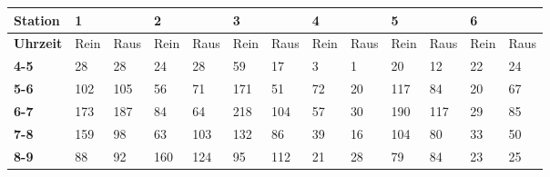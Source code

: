 \setlength\tabcolsep{5pt}
\begin{table}[H]
\centering
\begin{tabular}{|l|l|l|l|l|l|l|l|l|l|l|l|l|}
\hline
\textbf{Station}        & \multicolumn{2}{l|}{\textbf{1}}                 & \multicolumn{2}{l|}{\textbf{2}}                 & \multicolumn{2}{l|}{\textbf{3}}                 & \multicolumn{2}{l|}{\textbf{4}}               & \multicolumn{2}{l|}{\textbf{5}}                 & \multicolumn{2}{l|}{\textbf{6}}               \\ \hline
\textbf{Uhrzeit}        & Rein                   & Raus                   & Rein                   & Raus                   & Rein                   & Raus                   & Rein                  & Raus                  & Rein                   & Raus                   & Rein                  & Raus                  \\ \hline
\textbf{4-5}            & 28                     & 28                     & 24                     & 28                     & 59                     & 17                     & 3                     & 1                     & 20                     & 12                     & 22                    & 24                    \\ \hline
\textbf{5-6}            & 102                    & 105                    & 56                     & 71                     & 171                    & 51                     & 72                    & 20                    & 117                    & 84                     & 20                    & 67                    \\ \hline
\textbf{6-7}            & 173                    & 187                    & 84                     & 64                     & 218                    & 104                    & 57                    & 30                    & 190                    & 117                    & 29                    & 85                    \\ \hline
\textbf{7-8}            & 159                    & 98                     & 63                     & 103                    & 132                    & 86                     & 39                    & 16                    & 104                    & 80                     & 33                    & 50                    \\ \hline
\textbf{8-9}            & 88                     & 92                     & 160                    & 124                    & 95                     & 112                    & 21                    & 28                    & 79                     & 84                     & 23                    & 25                    \\ \hline

\end{tabular}
\end{table}
